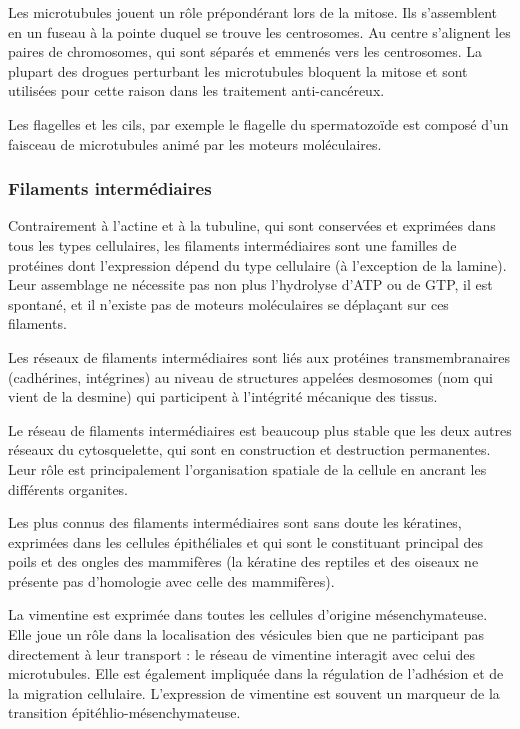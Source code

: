 \documentclass{report}
\begin{document}
Les microtubules jouent un rôle prépondérant lors de la mitose. Ils s'assemblent en un fuseau à la pointe duquel se trouve les centrosomes. Au centre s'alignent les paires de chromosomes, qui sont séparés et emmenés vers les centrosomes. La plupart des drogues perturbant les microtubules bloquent la mitose et sont utilisées pour cette raison dans les traitement anti-cancéreux. 

Les flagelles et les cils, par exemple le flagelle du spermatozoïde est composé d'un faisceau de microtubules animé par les moteurs moléculaires. 

\subsubsection{Filaments intermédiaires}

Contrairement à l'actine et à la tubuline, qui sont conservées et exprimées dans tous les types cellulaires, les filaments intermédiaires sont une familles de protéines dont l'expression dépend du type cellulaire (à l'exception de la lamine). 
Leur assemblage ne nécessite pas non plus l'hydrolyse d'ATP ou de GTP, il est spontané, et il n'existe pas de moteurs moléculaires se déplaçant sur ces filaments. 

Les réseaux de filaments intermédiaires sont liés aux protéines transmembranaires (cadhérines, intégrines) au niveau de structures appelées desmosomes (nom qui vient de la desmine) qui participent à l'intégrité mécanique des tissus. 

Le réseau de filaments intermédiaires est beaucoup plus stable que les deux autres réseaux du cytosquelette, qui sont en construction et destruction permanentes. Leur rôle est principalement l'organisation spatiale de la cellule en ancrant les différents organites. 

Les plus connus des filaments intermédiaires sont sans doute les kératines, exprimées dans les cellules épithéliales et qui sont le constituant principal des poils et des ongles des mammifères (la kératine des reptiles et des oiseaux ne présente pas d'homologie avec celle des mammifères). 

La vimentine est exprimée dans toutes les cellules d'origine mésenchymateuse. Elle joue un rôle dans la localisation des vésicules bien que ne participant pas directement à leur transport : le réseau de vimentine interagit avec celui des microtubules. Elle est également impliquée dans la régulation de l'adhésion et de la migration cellulaire. 
L'expression de vimentine est souvent un marqueur de la transition épitéhlio-mésenchymateuse. 
\end{document}
